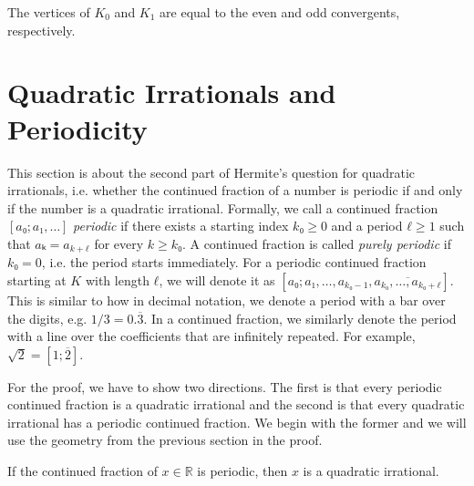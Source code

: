 \begin{corollary}
  The vertices of $K_0$ and $K_1$ are equal to the
  even and odd convergents, respectively.
\end{corollary}

\section{Quadratic Irrationals and Periodicity}

This section is about the second part of Hermite's question for quadratic
irrationals, i.e. whether the continued fraction of a number is periodic if and only
if the number is a quadratic irrational.
Formally, we call a continued fraction $[a₀; a₁, …]$ \emph{periodic}
if there exists a starting index $k₀ ≥ 0$ and a period $ℓ ≥ 1$ such that $aₖ = a_{k+ℓ}$ for every $k ≥ k₀$.
A continued fraction is called \emph{purely periodic} if $k₀ = 0$,
i.e. the period starts immediately.
For a periodic continued fraction starting at $K$ with length $ℓ$,
we will denote it as $[a₀; a₁, …, a_{k₀-1}, \overline{a_{k₀}, …, a_{k₀+ℓ}}]$.
This is similar to how in decimal notation, we denote a period with a bar over the digits,
e.g. $1/3 = 0.\overline{3}$.
In a continued fraction, we similarly denote the period with a line over the
coefficients that are infinitely repeated.
For example, $\sqrt{2} = [1; \overline{2}]$.

For the proof, we have to show two directions.
The first is that every periodic continued fraction is a quadratic irrational
and the second is that every quadratic irrational has a periodic continued fraction.
We begin with the former and we will use the geometry from the previous section
in the proof.

\begin{theorem}
  If the continued fraction of $x ∈ ℝ$ is periodic, then $x$ is a quadratic irrational.
\end{theorem}

